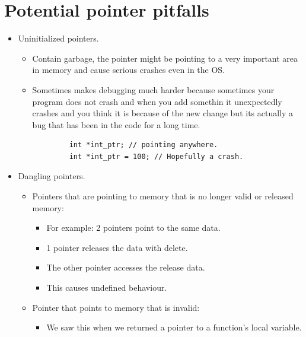 \section{Potential pointer pitfalls}
\begin{itemize}
    \item Uninitialized pointers.
        \begin{itemize}
            \item Contain garbage, the pointer might be pointing to a very important area in memory and cause serious crashes even in the OS.
            \item Sometimes makes debugging much harder because sometimes your program does not crash and when you add somethin it unexpectedly crashes and you think it is because of the new change but its actually a bug that has been in the code for a long time.
        \end{itemize}
        \begin{verbatim}
            int *int_ptr; // pointing anywhere.
            int *int_ptr = 100; // Hopefully a crash.
        \end{verbatim}
        
    \item Dangling pointers.
        \begin{itemize}
            \item Pointers that are pointing to memory that is no longer valid or released memory:
                \begin{itemize}
                    \item For example: 2 pointers point to the same data.
                    \item 1 pointer releases the data with delete.
                    \item The other pointer accesses the release data.
                    \item This causes undefined behaviour.
                \end{itemize}
            
            \item Pointer that points to memory that is invalid:
                \begin{itemize}
                    \item We saw this when we returned a pointer to a function's local variable.
                \end{itemize}
        \end{itemize}


\end{itemize}
